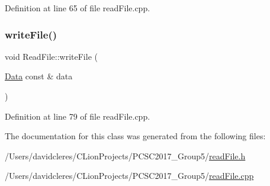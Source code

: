 Definition at line 65 of file read\+File.\+cpp.

\mbox{\label{class_read_file_ac11779a3630a2c1d62ab4566abb4034a}} 
\subsubsection{\texorpdfstring{write\+File()}{writeFile()}}
{\footnotesize\ttfamily void Read\+File\+::write\+File (\begin{DoxyParamCaption}\item[{\mbox{\hyperlink{struct_data}{Data}} const \&}]{data }\end{DoxyParamCaption})}







Definition at line 79 of file read\+File.\+cpp.



The documentation for this class was generated from the following files\+:\begin{DoxyCompactItemize}
\item 
/\+Users/davidcleres/\+C\+Lion\+Projects/\+P\+C\+S\+C2017\+\_\+\+Group5/\mbox{\hyperlink{read_file_8h}{read\+File.\+h}}\item 
/\+Users/davidcleres/\+C\+Lion\+Projects/\+P\+C\+S\+C2017\+\_\+\+Group5/\mbox{\hyperlink{read_file_8cpp}{read\+File.\+cpp}}\end{DoxyCompactItemize}
